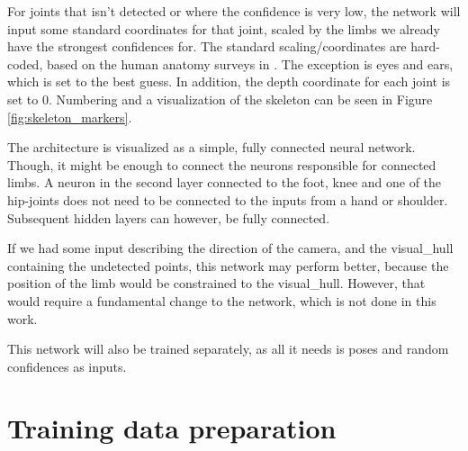 For joints that isn't detected or where the confidence is very low, the network will input some standard coordinates for that joint, scaled by the limbs we already have the strongest confidences for. The standard scaling/coordinates are hard-coded, based on the human anatomy surveys in \cite{bodySegmentParams}. The exception is eyes and ears, which is set to the best guess. In addition, the depth coordinate for each joint is set to 0. Numbering and a visualization of the skeleton can be seen in Figure \ref{fig:skeleton_markers}.

The architecture is visualized as a simple, fully connected neural network. Though, it might be enough to connect the neurons responsible for connected limbs. A neuron in the second layer connected to the foot, knee and one of the hip-joints does not need to be connected to the inputs from a hand or shoulder. Subsequent hidden layers can however, be fully connected.

If we had some input describing the direction of the camera, and the \gls{visual_hull} containing the undetected points, this network may perform better, because the position of the limb would be constrained to the \gls{visual_hull}. However, that would require a fundamental change to the network, which is not done in this work.

This network will also be trained separately, as all it needs is poses and random confidences as inputs.

\section{Training data preparation}

